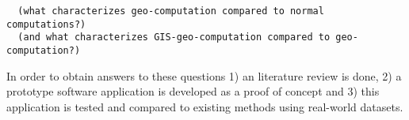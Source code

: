 \begin{lstlisting}
  (what characterizes geo-computation compared to normal computations?)
  (and what characterizes GIS-geo-computation compared to geo-computation?)
\end{lstlisting}


In order to obtain answers to these questions 
1) an literature review is done, 
2) a prototype software application is developed as a proof of concept and 
3) this application is tested and compared to existing methods using real-world datasets.







